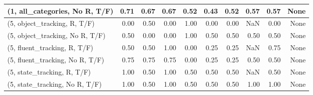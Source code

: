 \begin{table*}[h!]
\begin{adjustbox}{width=2\columnwidth,center}
\begin{tabular}{lrrr|rrr|rrr}
(1, all\_categories, No R, T/F)       &                      0.71 &                  0.67 &                      0.67 &                          0.52 &                      0.43 &                          0.52 &                                   0.57 &                               0.57 &                                  None \\



\midrule
(5, object\_tracking, R, T/F)         &                      0.00 &                  0.50 &                      0.00 &                          1.00 &                      0.00 &                          0.00 &                                    NaN &                               0.00 &                                  None \\
(5, object\_tracking, No R, T/F)      &                      0.50 &                  0.00 &                      0.00 &                          1.00 &                      0.50 &                          0.50 &                                   0.50 &                               0.50 &                                  None \\
(5, fluent\_tracking, R, T/F)         &                      0.50 &                  0.50 &                      1.00 &                          0.00 &                      0.25 &                          0.25 &                                    NaN &                               0.75 &                                  None \\
(5, fluent\_tracking, No R, T/F)      &                      0.75 &                  0.75 &                      0.75 &                          0.00 &                      0.25 &                          0.25 &                                   0.50 &                               0.50 &                                  None \\
(5, state\_tracking, R, T/F)          &                      1.00 &                  0.50 &                      1.00 &                          0.50 &                      0.50 &                          0.50 &                                    NaN &                               0.50 &                                  None \\
(5, state\_tracking, No R, T/F)       &                      1.00 &                  0.50 &                      1.00 &                          0.50 &                      0.50 &                          0.50 &                                   1.00 &                               1.00 &                                  None \\

\end{tabular}
\end{adjustbox}
\end{table*}

